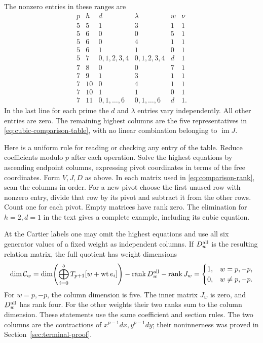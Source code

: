 \documentclass[11pt]{article}
\theoremstyle{plain}
\theoremstyle{definition}
\theoremstyle{remark}
\numberwithin{equation}{section}
\newcommand{\im}{\operatorname{im}}
\begin{document}
The nonzero entries in these ranges are
\[
\begin{array}{c|c|c|c|c|c}
 p&h&d&\lambda&w&\nu\\ \hline
 5&5&1&3&1&1\\
 5&6&0&0&5&1\\
 5&6&0&4&1&1\\
 5&6&1&1&0&1\\
 5&7&0,1,2,3,4&0,1,2,3,4&d&1\\ \hline
 7&8&0&0&7&1\\
 7&9&1&3&1&1\\
 7&10&0&4&1&1\\
 7&10&1&1&0&1\\
 7&11&0,1,\ldots,6&0,1,\ldots,6&d&1.
\end{array}
\]
In the last line for each prime the \(d\) and \(\lambda\)
entries vary independently. All other entries are zero.
The remaining highest columns are the five representatives in
\eqref{eq:cubic-comparison-table}, with no linear combination
belonging to \(\im J\).

Here is a uniform rule for reading or checking any entry of the table.
Reduce coefficients modulo \(p\) after each operation. Solve the
highest equations by ascending endpoint columns, expressing pivot
coordinates in terms of the free coordinates. Form \(V,J,D\) as
above. In each matrix used in \eqref{eq:comparison-rank}, scan the
columns in order. For a new pivot choose the first unused row with
nonzero entry, divide that row by its pivot and subtract it from
the other rows. Count one for each pivot. Empty matrices have rank
zero. The elimination for \(h=2,d=1\) in the text
gives a complete example, including its cubic equation.

At the Cartier labels one may omit the highest equations and use
all six generator values of a fixed weight as independent columns.
If \(D_w^{\rm all}\) is the resulting relation matrix, the full
quotient has weight dimensions
\begin{equation}\label{eq:cartier-full-comparison}
 \dim\mathcal C_w
 =\dim\!\left(\bigoplus_{i=0}^5T_{p+1}[w+\operatorname{wt}e_i]\right)
       -\operatorname{rank}D_w^{\rm all}-\operatorname{rank}J_w
 =\begin{cases}1,&w=p,-p,\\0,&w\ne p,-p.\end{cases}
\end{equation}
For \(w=p,-p\), the column dimension is five. The inner matrix
\(J_w\) is zero, and \(D_w^{\rm all}\) has rank four.
For the other weights their two ranks sum to the column dimension.
These statements use the same coefficient and section rules.
The two columns are the contractions of
\(x^{p-1}dx,y^{p-1}dy\); their noninnerness was proved in
Section~\ref{sec:terminal-proof}.
\end{document}
